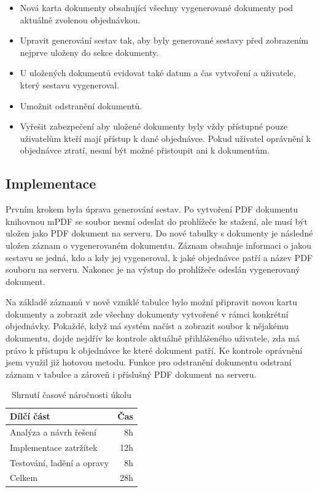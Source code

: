 \begin{itemize}
    \item Nová karta dokumenty obsahující všechny vygenerované dokumenty pod aktuálně zvolenou objednávkou.
    \item Upravit generování sestav tak, aby byly generované sestavy před zobrazením nejprve uloženy do sekce dokumenty.
    \item U uložených dokumentů evidovat také datum a čas vytvoření a uživatele, který sestavu vygeneroval.
    \item Umožnit odstranění dokumentů.
    \item Vyřešit zabezpečení aby uložené dokumenty byly vždy přístupné pouze uživatelům kteří mají přístup k dané objednávce. Pokud uživatel oprávnění k objednávce ztratí, nesmí být možné přistoupit ani k dokumentům.
\end{itemize}

\subsection{Implementace}

Prvním krokem byla úprava generování sestav. Po vytvoření PDF dokumentu knihovnou mPDF se soubor nesmí odeslat do prohlížeče ke stažení, ale musí být uložen jako PDF dokument 
na serveru. Do nové tabulky s dokumenty je následné uložen záznam o vygenerovaném dokumentu. Záznam obsahuje informaci o jakou sestavu se jedná, kdo a kdy jej vygeneroval, k jaké objednávce patří a název PDF souboru na serveru. Nakonec je na výstup do prohlížeče odeslán vygenerovaný dokument.

Na základě záznamů v nově vzniklé tabulce bylo možní připravit novou kartu dokumenty a zobrazit zde všechny dokumenty vytvořené v rámci konkrétní objednávky. Pokaždé, když má systém načíst a zobrazit soubor k nějakému dokumentu, dojde nejdřív ke kontrole aktuálně přihlášeného uživatele, zda má právo k přístupu k objednávce ke které dokument patří. Ke kontrole oprávnění jsem využil již hotovou metodu. Funkce pro odstranění dokumentu odstraní záznam v tabulce a zároveň i příslušný PDF dokument na serveru. 


\begin{table}
	\centering
	\caption[Časová náročnost úkolu na dokumenty]{Shrnutí časové náročnosti úkolu}
	\label{tab:TopLevelTableLabel}
		\begin{tabular}{lr}
			\toprule
			Dílčí část & Čas\\
			\midrule
			Analýza a návrh řešení & 8h \\
			Implementace zatržítek & 12h \\
            Testování, ladění a opravy & 8h \\
            \midrule
            Celkem  & 28h \\
			\midrule
		\end{tabular}
\end{table}


